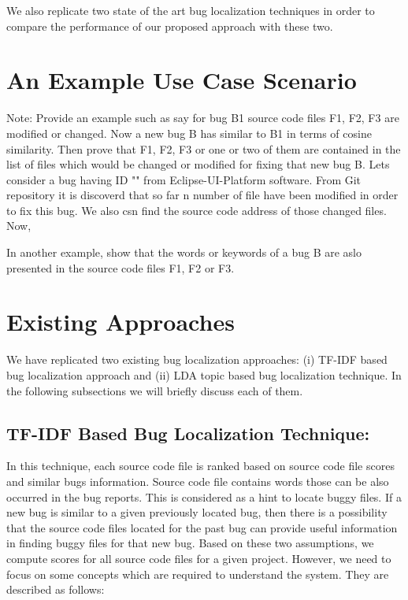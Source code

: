 \documentclass[conference]{IEEEtran}
\begin{document}
We also replicate two state of the art bug localization techniques in order to compare the performance of our proposed approach with these two.

\section{An Example Use Case Scenario}\label{sec:usecase}
Note:
Provide an example such as say for bug B1 source code files F1, F2, F3 are modified or changed. Now a new bug B has similar to B1 in terms of cosine similarity. Then prove that F1, F2, F3 or one or two of them are contained in the list of files which would be changed or modified for fixing that new bug B.
Lets consider a bug having ID "" from Eclipse-UI-Platform software. From Git repository it is discoverd that so far n number of file have been modified in order to fix this bug. We also csn find the source code address of those changed files. Now, 

In another example, show that the words or keywords of a bug B are aslo presented in the source code files F1, F2 or F3. 

\section{Existing Approaches}\label{sec:existing}
We have replicated two existing bug localization approaches: (i) TF-IDF based bug localization approach and (ii) LDA topic based bug localization technique. In the following subsections we will briefly discuss each of them.
\subsection{TF-IDF Based Bug Localization Technique:}
In this technique, each source code file is ranked based on source code file scores and similar bugs information. Source code file contains words those can be also occurred in the bug reports. This is considered as a hint to locate buggy files. If a new bug is similar to a given previously located bug, then there is a possibility that the source code files located for the past bug can provide useful information in finding buggy files for that new bug. Based on these two assumptions, we compute scores for all source code files for a given project. However, we need to focus on some concepts which are required to understand the  system. They are described as follows:
\end{document}
